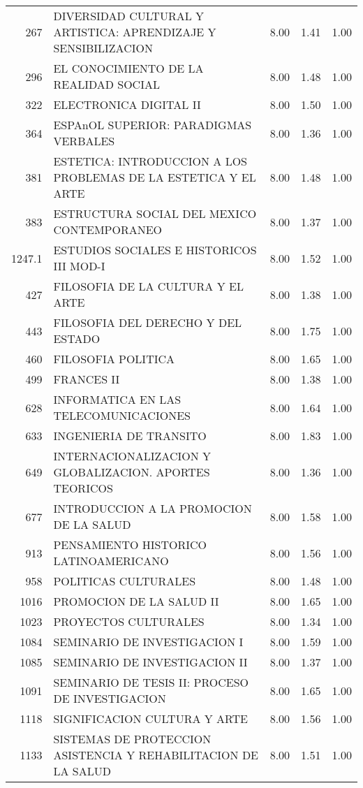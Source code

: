\documentclass[12pt]{article}
\begin{document}
\begin{table}[ht]
\begin{tabular}{rlrrr}
  267 & DIVERSIDAD CULTURAL Y ARTISTICA: APRENDIZAJE Y SENSIBILIZACION & 8.00 & 1.41 & 1.00 \\ 
  296 & EL CONOCIMIENTO DE LA REALIDAD SOCIAL & 8.00 & 1.48 & 1.00 \\ 
  322 & ELECTRONICA DIGITAL II & 8.00 & 1.50 & 1.00 \\ 
  364 & ESPAnOL SUPERIOR: PARADIGMAS VERBALES & 8.00 & 1.36 & 1.00 \\ 
  381 & ESTETICA: INTRODUCCION A LOS PROBLEMAS DE LA ESTETICA Y EL ARTE & 8.00 & 1.48 & 1.00 \\ 
  383 & ESTRUCTURA SOCIAL DEL MEXICO CONTEMPORANEO & 8.00 & 1.37 & 1.00 \\ 
  1247.1 & ESTUDIOS SOCIALES E HISTORICOS III MOD-I & 8.00 & 1.52 & 1.00 \\ 
  427 & FILOSOFIA DE LA CULTURA Y EL ARTE & 8.00 & 1.38 & 1.00 \\ 
  443 & FILOSOFIA DEL DERECHO Y DEL ESTADO & 8.00 & 1.75 & 1.00 \\ 
  460 & FILOSOFIA POLITICA & 8.00 & 1.65 & 1.00 \\ 
  499 & FRANCES II & 8.00 & 1.38 & 1.00 \\ 
  628 & INFORMATICA EN LAS TELECOMUNICACIONES & 8.00 & 1.64 & 1.00 \\ 
  633 & INGENIERIA DE TRANSITO & 8.00 & 1.83 & 1.00 \\ 
  649 & INTERNACIONALIZACION Y GLOBALIZACION. APORTES TEORICOS & 8.00 & 1.36 & 1.00 \\ 
  677 & INTRODUCCION A LA PROMOCION DE LA SALUD & 8.00 & 1.58 & 1.00 \\ 
  913 & PENSAMIENTO HISTORICO LATINOAMERICANO & 8.00 & 1.56 & 1.00 \\ 
  958 & POLITICAS CULTURALES & 8.00 & 1.48 & 1.00 \\ 
  1016 & PROMOCION DE LA SALUD II & 8.00 & 1.65 & 1.00 \\ 
  1023 & PROYECTOS CULTURALES & 8.00 & 1.34 & 1.00 \\ 
  1084 & SEMINARIO DE INVESTIGACION I & 8.00 & 1.59 & 1.00 \\ 
  1085 & SEMINARIO DE INVESTIGACION II & 8.00 & 1.37 & 1.00 \\ 
  1091 & SEMINARIO DE TESIS II: PROCESO DE INVESTIGACION & 8.00 & 1.65 & 1.00 \\ 
  1118 & SIGNIFICACION CULTURA Y ARTE & 8.00 & 1.56 & 1.00 \\ 
  1133 & SISTEMAS DE PROTECCION ASISTENCIA Y REHABILITACION DE LA SALUD & 8.00 & 1.51 & 1.00 \\ 

\end{tabular}
\end{table}
\end{document}
